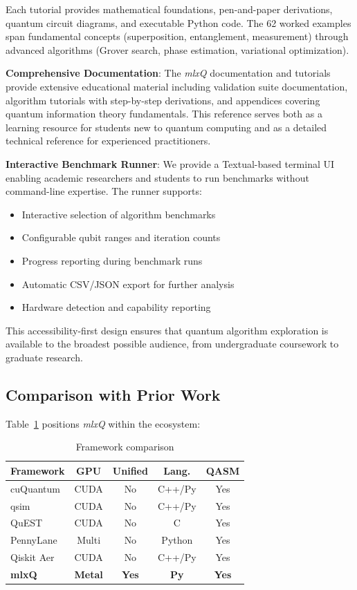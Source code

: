 \documentclass[runningheads]{llncs}
\newcommand{\mlxquantum}{\textit{mlxQ}\xspace}
\begin{document}
Each tutorial provides mathematical foundations, pen-and-paper derivations, quantum circuit diagrams, and executable Python code. The 62 worked examples span fundamental concepts (superposition, entanglement, measurement) through advanced algorithms (Grover search, phase estimation, variational optimization).

\textbf{Comprehensive Documentation}: The \mlxquantum documentation and tutorials provide extensive educational material including validation suite documentation, algorithm tutorials with step-by-step derivations, and appendices covering quantum information theory fundamentals. This reference serves both as a learning resource for students new to quantum computing and as a detailed technical reference for experienced practitioners.

\textbf{Interactive Benchmark Runner}: We provide a Textual-based terminal UI enabling academic researchers and students to run benchmarks without command-line expertise. The runner supports:
\begin{itemize}
    \item Interactive selection of algorithm benchmarks
    \item Configurable qubit ranges and iteration counts
    \item Progress reporting during benchmark runs
    \item Automatic CSV/JSON export for further analysis
    \item Hardware detection and capability reporting
\end{itemize}

This accessibility-first design ensures that quantum algorithm exploration is available to the broadest possible audience, from undergraduate coursework to graduate research.

\subsection{Comparison with Prior Work}

Table~\ref{tab:comparison} positions \mlxquantum within the ecosystem:

\begin{table}[t]
\caption{Framework comparison}
\label{tab:comparison}
\centering
\footnotesize
\begin{tabular}{lcccc}
\toprule
Framework & GPU & Unified & Lang. & QASM \\
\midrule
cuQuantum & CUDA & No & C++/Py & Yes \\
qsim & CUDA & No & C++/Py & Yes \\
QuEST & CUDA & No & C & Yes \\
PennyLane & Multi & No & Python & Yes \\
Qiskit Aer & CUDA & No & C++/Py & Yes \\
\textbf{mlxQ} & \textbf{Metal} & \textbf{Yes} & \textbf{Py} & \textbf{Yes} \\
\bottomrule
\end{tabular}
\end{table}
\end{document}

